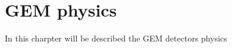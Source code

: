 \documentclass[]{book}
\begin{document}
\chapter{GEM physics}

In this charpter will be described the GEM detectors physics
\end{document}
